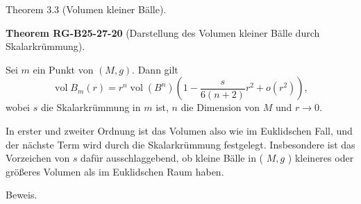 \documentclass[10pt, letterpaper]{article}
\newcommand{\CustomHeading}[3]{%
  \par\medskip\noindent%
  \textbf{#1 #2} \textnormal{(#3)}.\enskip%
}
\newenvironment{THEO}[2]{\begin{unitbox}\CustomHeading{Theorem}{#1}{#2}}{\end{unitbox}}
\begin{document}
Theorem 3.3 (Volumen kleiner Bälle). 


\begin{THEO}{RG-B25-27-20}{Darstellung des Volumen kleiner Bälle durch Skalarkrümmung}
Sei $m$ ein Punkt von $(M, g)$. Dann gilt
$$
\operatorname{vol} B_{m}(r)=r^{n} \operatorname{vol}\left(B^{n}\right)\left(1-\frac{s}{6(n+2)} r^{2}+o\left(r^{2}\right)\right),
$$
wobei $s$ die Skalarkrümmung in $m$ ist, $n$ die Dimension von $M$ und $r \rightarrow 0$.

In erster und zweiter Ordnung ist das Volumen also wie im Euklidschen Fall, und der nächste Term wird durch die Skalarkrümmung festgelegt. Insbesondere ist das Vorzeichen von $s$ dafür ausschlaggebend, ob kleine Bälle in ( $M, g$ ) kleineres oder größeres Volumen als im Euklidschen Raum haben.
\end{THEO}


Beweis. 
\end{document}
